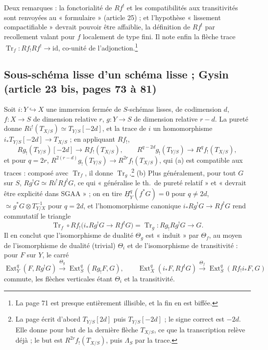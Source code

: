 \documentclass[11pt,a4paper]{article}
\begin{document}
Deux remarques : la fonctorialité de $Rf^{!}$ et les compatibilités aux
transitivités sont renvoyées au « formulaire » (article 25) ; et l'hypothèse
« lissement compactifiable » devrait pouvoir être affaiblie, la définition
de $Rf^{!}$ par recollement valant pour $f$ localement de type fini. Il note
enfin la flèche trace $\operatorname{Tr}_{f} : Rf_{!}Rf^{!} \to \mathrm{id}$, co-unité
de l'adjonction.\footnote{La page 71 est presque entièrement illisible, et la
fin en est biffée.}

\subsection*{Sous-schéma lisse d'un schéma lisse ; Gysin (article 23 bis, pages 73 à 81)}

Soit $i : Y \hookrightarrow X$ une immersion fermée de $S$-schémas lisses, de
codimension $d$, $f : X \to S$ de dimension relative $r$, $g : Y \to S$ de
dimension relative $r - d$. La pureté donne $Ri^{!}(T_{X/S}) \simeq
T_{Y/S}[-2d]$, et la trace de $i$ un homomorphisme $i_{*}T_{Y/S}[-2d] \to
T_{X/S}$ ; en appliquant $Rf_{!}$,
\[
  Rg_{!}(T_{Y/S})[-2d] \longrightarrow Rf_{!}(T_{X/S}), \qquad
  R^{q-2d}g_{!}(T_{Y/S}) \longrightarrow R^{q}f_{!}(T_{X/S}),
\]
et pour $q = 2r$, $R^{2(r-d)}g_{!}(T_{Y/S}) \to R^{2r}f_{!}(T_{X/S})$, qui (a)
est compatible aux traces : composé avec $\operatorname{Tr}_{f}$, il donne
$\operatorname{Tr}_{g}$.\footnote{La page écrit d'abord $T_{Y/S}[2d]$ puis
$T_{Y/S}[-2d]$ ; le signe correct est $-2d$. Elle donne pour but de la dernière
flèche $T_{X/S}$, ce que la transcription relève déjà ; le but est
$R^{2r}f_{!}(T_{X/S})$, puis $\Lambda_{S}$ par la trace.} (b) Plus
généralement, pour tout $G$ sur $S$, $Rg^{!}G \simeq Ri^{!}Rf^{!}G$, ce qui
« généralise le th.\ de pureté relatif » et « devrait être explicité dans
SGAA » ; on en tire $\underline{H}^{q}_{Y}(f^{*}G) = 0$ pour $q \neq 2d$,
$\simeq g^{*}G \otimes T_{Y/X}^{-1}$ pour $q = 2d$, et l'homomorphisme canonique
$i_{*}Rg^{!}G \to Rf^{!}G$ rend commutatif le triangle
\[
  \operatorname{Tr}_{f} \circ Rf_{!}\bigl(i_{*}Rg^{!}G \to Rf^{!}G\bigr) =
  \operatorname{Tr}_{g} : Rg_{!}Rg^{!}G \to G.
\]
Il en conclut que l'isomorphisme de dualité $\Theta_{g}$ est « induit » par
$\Theta_{f}$, au moyen de l'isomorphisme de dualité (trivial) $\Theta_{i}$ et de
l'isomorphisme de transitivité : pour $F$ sur $Y$, le carré
\[
  \operatorname{Ext}^{q}_{Y}(F, Rg^{!}G) \xrightarrow{\Theta_{g}}
  \operatorname{Ext}^{q}_{S}(Rg_{!}F, G), \qquad
  \operatorname{Ext}^{q}_{X}(i_{*}F, Rf^{!}G) \xrightarrow{\Theta_{f}}
  \operatorname{Ext}^{q}_{S}(Rf_{!}i_{*}F, G)
\]
commute, les flèches verticales étant $\Theta_{i}$ et la transitivité.
\end{document}
